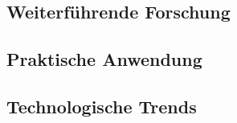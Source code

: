 \subsection{Weiterführende Forschung}

\subsection{Praktische Anwendung}

\subsection{Technologische Trends}
